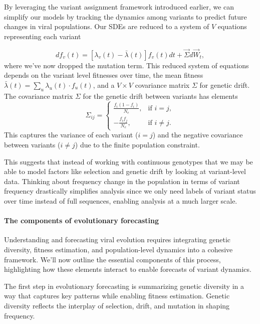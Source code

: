 By leveraging the variant assignment framework introduced earlier, we can simplify our models by tracking the dynamics among variants to predict future changes in viral populations.
Our SDEs are reduced to a system of $V$ equations representing each variant

\begin{equation}
  df_v(t) = \left[\lambda_{v}(t) - \bar{\lambda}(t)\right] f_v(t) dt + \vec{\Sigma} d\vec{W}_{t},
\end{equation}
where we've now dropped the mutation term.
This reduced system of equations depends on the variant level fitnesses over time, the mean fitness $\bar{\lambda}(t) = \sum_{u} \lambda_u(t)\cdot f_u(t)$, and a $V \times V$ covariance matrix $\Sigma$ for genetic drift.
The covariance matrix $\Sigma$ for the genetic drift between variants has elements
\begin{equation}
\Sigma_{ij} = \begin{cases}
  \frac{f_i (1 - f_i)}{N_e}, & \text{if } i = j, \\
  -\frac{f_i f_j}{N_e}, & \text{if } i \neq j.
\end{cases}
\end{equation}
This captures the variance of each variant ($i = j$) and the negative covariance between variants ($i \neq j$) due to the finite population constraint.

This suggests that instead of working with continuous genotypes that we may be able to model factors like selection and genetic drift by looking at variant-level data.
Thinking about frequency change in the population in terms of variant frequency drastically simplifies analysis since we only need labels of variant status over time instead of full sequences, enabling analysis at a much larger scale.

\paragraph{The components of evolutionary forecasting}

Understanding and forecasting viral evolution requires integrating genetic diversity, fitness estimation, and population-level dynamics into a cohesive framework.
We'll now outline the essential components of this process, highlighting how these elements interact to enable forecasts of variant dynamics.

The first step in evolutionary forecasting is summarizing genetic diversity in a way that captures key patterns  while enabling fitness estimation.
Genetic diversity reflects the interplay of selection, drift, and mutation in shaping frequency.


